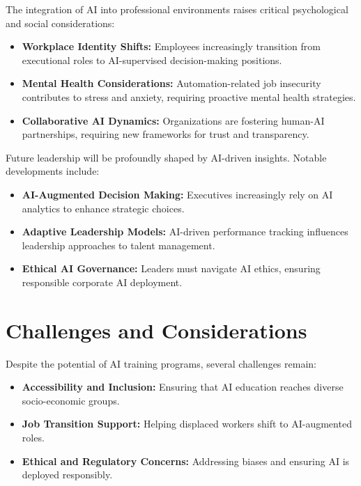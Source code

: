 \documentclass[a4paper,headinclude=on,footinclude=on,12pt,oneside]{scrbook}
\begin{document}

The integration of AI into professional environments raises critical psychological and social considerations:
\begin{itemize}
	\item \textbf{Workplace Identity Shifts:} Employees increasingly transition from executional roles to AI-supervised decision-making positions.
	\item \textbf{Mental Health Considerations:} Automation-related job insecurity contributes to stress and anxiety, requiring proactive mental health strategies.
	\item \textbf{Collaborative AI Dynamics:} Organizations are fostering human-AI partnerships, requiring new frameworks for trust and transparency.
\end{itemize}


Future leadership will be profoundly shaped by AI-driven insights. Notable developments include:
\begin{itemize}
	\item \textbf{AI-Augmented Decision Making:} Executives increasingly rely on AI analytics to enhance strategic choices.
	\item \textbf{Adaptive Leadership Models:} AI-driven performance tracking influences leadership approaches to talent management.
	\item \textbf{Ethical AI Governance:} Leaders must navigate AI ethics, ensuring responsible corporate AI deployment.
\end{itemize}


\section{Challenges and Considerations}

Despite the potential of AI training programs, several challenges remain:
\begin{itemize}
	\item \textbf{Accessibility and Inclusion:} Ensuring that AI education reaches diverse socio-economic groups.
	\item \textbf{Job Transition Support:} Helping displaced workers shift to AI-augmented roles.
	\item \textbf{Ethical and Regulatory Concerns:} Addressing biases and ensuring AI is deployed responsibly.
\end{itemize}
\end{document}
